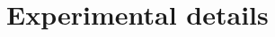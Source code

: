 {%



\begin{lemma}
\label{lemma:correlated-weights-nn}
\end{lemma}

}%

\section{Experimental details \label{app:experimental}}

